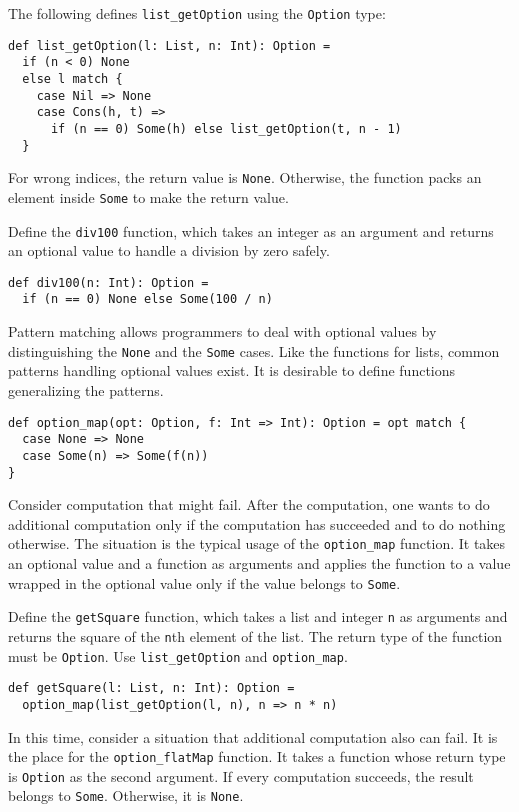 The following defines \verb!list_getOption! using the \verb!Option! type:

\begin{verbatim}
def list_getOption(l: List, n: Int): Option =
  if (n < 0) None
  else l match {
    case Nil => None
    case Cons(h, t) =>
      if (n == 0) Some(h) else list_getOption(t, n - 1)
  }
\end{verbatim}

For wrong indices, the return value is \verb!None!. Otherwise, the function packs
an element inside \verb!Some! to make the return value.

Define the \verb!div100! function, which takes an integer as an argument and
returns an optional value to handle a division by zero safely.

\begin{verbatim}
def div100(n: Int): Option =
  if (n == 0) None else Some(100 / n)
\end{verbatim}

Pattern matching allows programmers to deal with optional values by
distinguishing the \verb!None! and the \verb!Some! cases. Like the functions for
lists, common patterns handling optional values exist. It is desirable to define
functions generalizing the patterns.

\begin{verbatim}
def option_map(opt: Option, f: Int => Int): Option = opt match {
  case None => None
  case Some(n) => Some(f(n))
}
\end{verbatim}

Consider computation that might fail. After the computation, one wants to do
additional computation only if the computation has succeeded and to do nothing
otherwise. The situation is the typical usage of the \verb!option_map! function.
It takes an optional value and a function as arguments and applies the function
to a value wrapped in the optional value only if the value belongs to
\verb!Some!.

Define the \verb!getSquare! function, which takes a list and integer \verb!n! as
arguments and returns the square of the \verb!n!th element of the list. The
return type of the function must be \verb!Option!. Use \verb!list_getOption! and
\verb!option_map!.

\begin{verbatim}
def getSquare(l: List, n: Int): Option =
  option_map(list_getOption(l, n), n => n * n)
\end{verbatim}

In this time, consider a situation that additional computation also can fail. It
is the place for the \verb!option_flatMap! function. It takes a function whose
return type is \verb!Option! as the second argument. If every computation
succeeds, the result belongs to \verb!Some!. Otherwise, it is \verb!None!.

